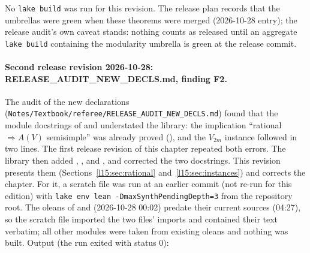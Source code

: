 No \texttt{lake build} was run for this revision. The release plan records that the umbrellas were green when these
theorems were merged (2026-10-28 entry); the release audit's own caveat stands: nothing counts as released until an aggregate
\texttt{lake build} containing the modularity umbrella is green at the release commit.

\paragraph{Second release revision 2026-10-28: RELEASE\_AUDIT\_NEW\_DECLS.md, finding F2.} The audit of the new declarations
(\texttt{Notes/\allowbreak Textbook/\allowbreak referee/\allowbreak RELEASE\_AUDIT\_NEW\_DECLS.md}) found that the module
docstrings of  and  understated the library: the
implication ``rational $\Rightarrow A(V)$ semisimple'' was already proved
(\allowbreak{}\allowbreak{}\allowbreak{}), and the $V_{2m}$ instance followed in two lines. The
first release revision of this chapter repeated both errors. The library then added
\allowbreak{}\allowbreak{}\allowbreak{}, \allowbreak{}\allowbreak{},
 and , and corrected the two docstrings. This revision presents them
(Sections~\ref{l15:sec:rational} and~\ref{l15:sec:instances}) and corrects the chapter. For it, a scratch file was run at
an earlier commit (not re-run for this edition) with \texttt{lake env lean -DmaxSynthPendingDepth=3} from the repository root. The oleans of
 and  (2026-10-28 00:02) predate their current sources
(04:27), so the scratch file imported the two files' imports and contained their text verbatim; all other modules were taken
from existing oleans and nothing was built. Output (the run exited with status 0):
